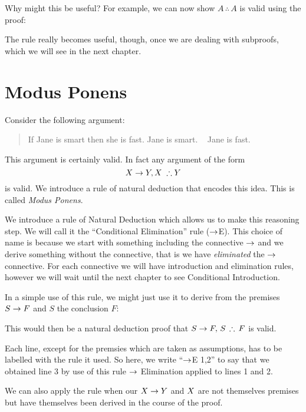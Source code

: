 Why might this be useful? For example, we can now show $A\,\therefore\,A$ is valid using the proof:
\begin{pf}
\end{pf}
The rule really becomes useful, though, once we are dealing with subproofs, which we will see in the next chapter. 

\section{Modus Ponens}
Consider the following argument:
	\begin{quote}
		If Jane is smart then she is fast. Jane is smart. \therefore~ Jane is fast.
	\end{quote}
This argument is certainly valid.
In fact any argument of the form $$\metaX\eif \metaY,\metaX\;\therefore\metaY$$ is valid. We introduce a rule of natural deduction that encodes this idea. This is
called \emph{Modus Ponens}. 

We introduce a rule of Natural Deduction which allows us to make this reasoning step. We will call it the ``Conditional Elimination'' rule ($\rightarrow$E). This choice of name is because we {start} with something including the connective $\rightarrow$ and we derive something without the connective, that is we have \emph{eliminated} the $\rightarrow$ connective. For each connective we will have introduction and elimination rules, however we will wait until the next chapter to see Conditional Introduction. 

In a simple use of this rule, we might just use it to derive from the premises $S\rightarrow F$ and $S$ the conclusion $F$:
\begin{pf}
	 
\end{pf}
This would then be a natural deduction proof that 
$S\eif F,\, S\,\therefore \, F$ is valid. 

Each line, except for the premsies which are taken as assumptions, has to be labelled with the rule it used. So here, we write ``$\rightarrow$E 1,2'' to say that we obtained line 3 by use of this rule $\rightarrow$ Elimination applied to lines 1 and 2. 

We can also apply the rule when our $X\rightarrow Y$ and $X$ are not themselves premises but have themselves been derived in the course of the proof. 

\begin{pf}
	 
\end{pf}

